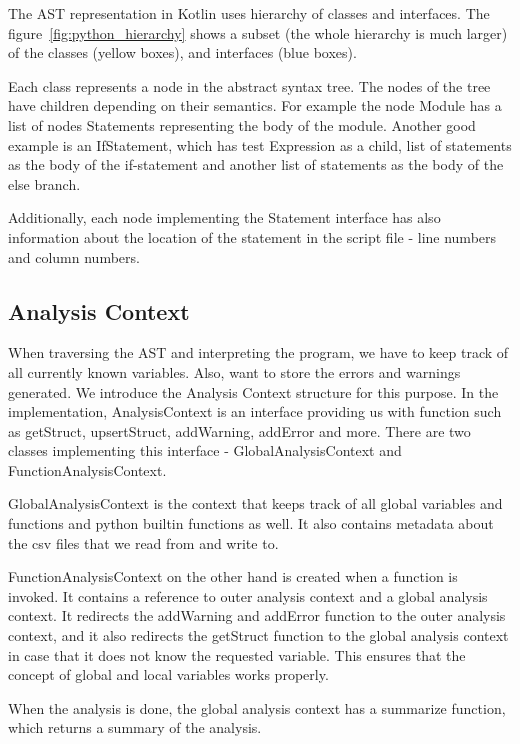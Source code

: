 The AST representation in Kotlin uses hierarchy of classes and interfaces.
The figure~\ref{fig:python_hierarchy} shows a subset (the whole hierarchy is much larger) of the classes (yellow boxes),
and interfaces (blue boxes).

Each class represents a node in the abstract syntax tree.
The nodes of the tree have children depending on their semantics.
For example the node Module has a list of nodes Statements representing the body of the module.
Another good example is an IfStatement, which has test Expression as a child, list of statements as the body of the
if-statement and another list of statements as the body of the else branch.

Additionally, each node implementing the Statement interface has also information about the location of the statement
in the script file - line numbers and column numbers.

\subsection{Analysis Context}

When traversing the AST and interpreting the program, we have to keep track of all currently known variables.
Also, want to store the errors and warnings generated.
We introduce the Analysis Context structure for this purpose.
In the implementation, AnalysisContext is an interface providing us with function such as getStruct, upsertStruct,
addWarning, addError and more.
There are two classes implementing this interface - GlobalAnalysisContext and FunctionAnalysisContext.

GlobalAnalysisContext is the context that keeps track of all global variables and functions and python builtin functions
as well.
It also contains metadata about the csv files that we read from and write to.

FunctionAnalysisContext on the other hand is created when a function is invoked.
It contains a reference to outer analysis context and a global analysis context.
It redirects the addWarning and addError function to the outer analysis context, and it also redirects the getStruct
function to the global analysis context in case that it does not know the requested variable.
This ensures that the concept of global and local variables works properly.

When the analysis is done, the global analysis context has a summarize function, which returns a summary of the analysis.



